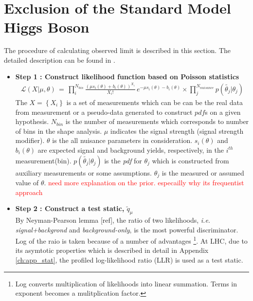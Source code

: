 \section{Exclusion of the Standard Model Higgs Boson} 
\label{sec:stat_exclusion}

The procedure of calculating observed limit is described in this section.
The detailed description can be found in \cite{combination_stat}.

\begin{itemize}
%
\item{\textbf{Step 1 : Construct likelihood function based on Poisson statistics} } \\
\begin{eqnarray} 
\mathcal{L} ( X | \mu, \theta) 
\, = \,
\prod_{i}^{N_{bin}} \frac{ \left( \mu s_i(\theta) + b_i(\theta) \right)^{X_i}}{X_i!} 
\, e^{ - \mu s_i(\theta) - b_i(\theta) }   \times
\prod_{j}^{N_{nuisance}} p\left( \tilde{\theta_j} | \theta_j \right)
\end{eqnarray}
The $X=\left\{X_i\right\}$ is a set of measurements which can be   
can be the real data from measurement or a pseudo-data generated 
to construct $pdf$s on a given hypothesis. $N_{bin}$ is the number of 
measurements which corresponds to number of bins in the shape analysis. 
$\mu$ indicates the signal strength (signal strength modifier).
$\theta$ is the all nuisance parameters in consideration. 
$s_i(\theta)$ and $b_i(\theta)$ are expected signal and background 
yields, respectively, in the $i^{th}$ measurement(bin).
$p\left( \tilde{\theta_j} | \theta_j \right)$ is the \textit{pdf} for 
$\theta_j$ which is constructed from auxiliary measurements or some  
assumptions. $\theta_j$ is the measured or assumed value of $\theta$. 
\textcolor{red}{need more explanation on the prior. 
especailly why its frequentist approach}  
%
\item{\textbf{Step 2 : Construct a test static, $\tilde{q}_\mu$} }  \\
By Neyman-Pearson lemma [ref], the ratio of two likelihoods, 
\textit{i.e. signal+backgrond} and \textit{background-only}, 
is the most powerful discriminator. 
Log of the raio is taken because of a number of advantages
\footnote{Log converts multiplication of likelihoods into linear summation. 
Terms in exponent becomes a mulitplication factor.}.  
At LHC, due to its asymtotic properties which is described in detail 
in Appendix \ref{ch:app_stat}, the profiled log-likelihood ratio (LLR) is used as a test static.   

\end{itemize}
